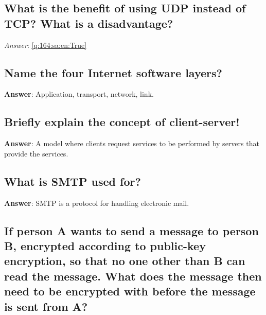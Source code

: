 \documentclass[a4paper,11pt,oneside]{article}
\begin{document}
\begin{sloppypar}
\subsection{What is the benefit of using UDP instead of TCP? What is a disadvantage?}

\label{q:164:sa:en:True}

\vspace{2cm}

\noindent\makebox[\textwidth]{\hrulefill}

\vspace{1cm}

\textit{Answer}: \autoref{q:164:sa:en:True}



\subsection{Name the four Internet software layers?}

\label{q:165:sa:en:True}

\textbf{Answer}: Application, transport, network, link.



\subsection{Briefly explain the concept of client-server!}

\label{q:166:sa:en:True}

\textbf{Answer}: A model where clients request services to be performed by servers that provide the services.



\subsection{What is SMTP used for?}

\label{q:167:sa:en:True}

\textbf{Answer}: SMTP is a protocol for handling electronic mail.



\subsection{If person A wants to send a message to person B, encrypted according to public-key encryption, so that no one other than B can read the message. What does the message then need to be encrypted with before the message is sent from A?}


\end{sloppypar}
\end{document}
